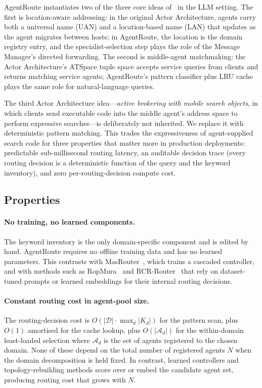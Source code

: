 \documentclass[11pt]{article}
\begin{document}
AgentRoute instantiates two of the three core ideas
of~\citet{jang2005efficient} in the LLM setting. The first is
location-aware addressing: in the original Actor Architecture, agents carry
both a universal name (UAN) and a location-based name (LAN) that updates as
the agent migrates between hosts; in AgentRoute, the location is the
domain registry entry, and the specialist-selection step plays the role of
the Message Manager's directed forwarding. The second is middle-agent
matchmaking: the Actor Architecture's ATSpace tuple space accepts service
queries from clients and returns matching service agents; AgentRoute's
pattern classifier plus LRU cache plays the same role for natural-language
queries.

The third Actor Architecture idea---\emph{active brokering with mobile
search objects}, in which clients send executable code into the middle
agent's address space to perform expressive searches---is deliberately
not inherited. We replace it with deterministic pattern matching. This
trades the expressiveness of agent-supplied search code for three
properties that matter more in production deployments: predictable
sub-millisecond routing latency, an auditable decision trace (every
routing decision is a deterministic function of the query and the
keyword inventory), and zero per-routing-decision compute cost.

\subsection{Properties}
\label{sec:design:properties}

\paragraph{No training, no learned components.}
The keyword inventory is the only domain-specific component and is edited
by hand. AgentRoute requires no offline training data and has no learned
parameters. This contrasts with MasRouter~\citep{yue2025masrouter},
which trains a cascaded controller, and with methods such as
RopMura~\citep{wang2025ropmura} and RCR-Router~\citep{liu2025rcrrouter}
that rely on dataset-tuned prompts or learned embeddings for their
internal routing decisions.

\paragraph{Constant routing cost in agent-pool size.}
The routing-decision cost is $O(|\mathcal{D}| \cdot \max_d |K_d|)$ for the
pattern scan, plus $O(1)$ amortised for the cache lookup, plus
$O(|\mathcal{A}_d|)$ for the within-domain least-loaded selection where
$\mathcal{A}_d$ is the set of agents registered to the chosen domain. None
of these depend on the total number of registered agents $N$ when the
domain decomposition is held fixed. In contrast, learned controllers and
topology-rebuilding methods score over or embed the candidate agent set,
producing routing cost that grows with $N$.
\end{document}
